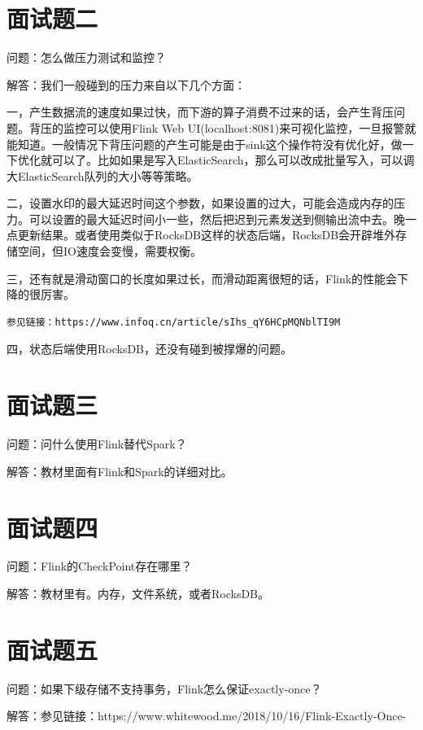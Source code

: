 \documentclass[oneside]{ctexbook}
\begin{document}
\section{面试题二}

问题：怎么做压力测试和监控？

解答：我们一般碰到的压力来自以下几个方面：

一，产生数据流的速度如果过快，而下游的算子消费不过来的话，会产生背压问题。背压的监控可以使用Flink Web UI(localhost:8081)来可视化监控，一旦报警就能知道。一般情况下背压问题的产生可能是由于sink这个操作符没有优化好，做一下优化就可以了。比如如果是写入ElasticSearch，那么可以改成批量写入，可以调大ElasticSearch队列的大小等等策略。

二，设置水印的最大延迟时间这个参数，如果设置的过大，可能会造成内存的压力。可以设置的最大延迟时间小一些，然后把迟到元素发送到侧输出流中去。晚一点更新结果。或者使用类似于RocksDB这样的状态后端，RocksDB会开辟堆外存储空间，但IO速度会变慢，需要权衡。

三，还有就是滑动窗口的长度如果过长，而滑动距离很短的话，Flink的性能会下降的很厉害。

\begin{lstlisting}
参见链接：https://www.infoq.cn/article/sIhs_qY6HCpMQNblTI9M
\end{lstlisting}

四，状态后端使用RocksDB，还没有碰到被撑爆的问题。

\section{面试题三}

问题：问什么使用Flink替代Spark？

解答：教材里面有Flink和Spark的详细对比。

\section{面试题四}

问题：Flink的CheckPoint存在哪里？

解答：教材里有。内存，文件系统，或者RocksDB。

\section{面试题五}

问题：如果下级存储不支持事务，Flink怎么保证exactly-once？

解答：参见链接：https://www.whitewood.me/2018/10/16/Flink-Exactly-Once-%
\end{document}
